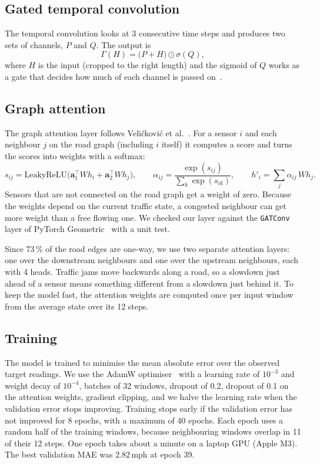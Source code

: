 \documentclass[11pt,a4paper]{article}
\begin{document}
\subsection{Gated temporal convolution}
The temporal convolution looks at 3 consecutive time steps and produces two sets of
channels, $P$ and $Q$. The output is
\begin{equation}
\Gamma(H)=\big(P+H\big)\odot\sigma(Q),
\end{equation}
where $H$ is the input (cropped to the right length) and the sigmoid of $Q$ works as a gate
that decides how much of each channel is passed on~\cite{dauphin2017glu}.

\subsection{Graph attention}
The graph attention layer follows Veli\v{c}kovi\'c et al.~\cite{velickovic2018gat}. For a sensor
$i$ and each neighbour $j$ on the road graph (including $i$ itself) it computes a score and
turns the scores into weights with a softmax:
\begin{equation}
s_{ij}=\mathrm{LeakyReLU}\big(\mathbf{a}_1^\top W h_i+\mathbf{a}_2^\top W h_j\big),\qquad
\alpha_{ij}=\frac{\exp(s_{ij})}{\sum_{k}\exp(s_{ik})},\qquad
h'_i=\sum_j \alpha_{ij}\,W h_j .
\end{equation}
Sensors that are not connected on the road graph get a weight of zero. Because the weights
depend on the current traffic state, a congested neighbour can get more weight than a free
flowing one. We checked our layer against the \texttt{GATConv} layer of PyTorch
Geometric~\cite{fey2019pyg} with a unit test.

Since 73\,\% of the road edges are one-way, we use two separate attention layers: one over
the downstream neighbours and one over the upstream neighbours, each with 4 heads. Traffic
jams move backwards along a road, so a slowdown just ahead of a sensor means something
different from a slowdown just behind it. To keep the model fast, the attention weights are
computed once per input window from the average state over its 12 steps.

\subsection{Training}
The model is trained to minimise the mean absolute error over the observed target readings.
We use the AdamW optimiser~\cite{loshchilov2019adamw} with a learning rate of $10^{-3}$ and
weight decay of $10^{-4}$, batches of 32 windows, dropout of 0.2, dropout of 0.1 on the
attention weights, gradient clipping, and we halve the learning rate when the validation
error stops improving. Training stops early if the validation error has not improved for 8
epochs, with a maximum of 40 epochs. Each epoch uses a random half of the training windows,
because neighbouring windows overlap in 11 of their 12 steps. One epoch takes about a minute
on a laptop GPU (Apple M3). The best validation MAE was 2.82\,mph at epoch 39.
\end{document}
